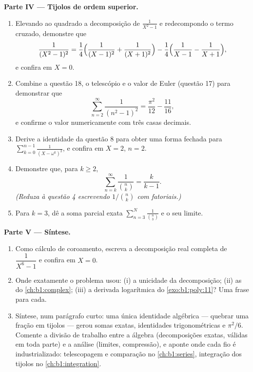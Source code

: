 \begin{problem}
\medskip
\noindent\textbf{Parte IV --- Tijolos de ordem superior.}
\begin{enumerate}
  \item Elevando ao quadrado a decomposição de $\frac1{X^2-1}$ e
        redecompondo o termo cruzado, demonstre que
        \[
        \frac1{(X^2-1)^2}
        = \frac14\Bigl(\frac1{(X-1)^2} + \frac1{(X+1)^2}\Bigr)
        - \frac14\Bigl(\frac1{X-1} - \frac1{X+1}\Bigr),
        \]
        e confira em $X = 0$.
  \item Combine a questão 18, o telescópio e o valor de Euler
        (questão 17) para demonstrar que
        \[
        \sum_{n=2}^{\infty}\frac1{(n^2-1)^2}
        = \frac{\pi^2}{12} - \frac{11}{16} ,
        \]
        e confirme o valor numericamente com três casas decimais.
  \item Derive a identidade da questão 8 para obter uma
        forma fechada para $\sum_{k=0}^{n-1}\frac1{(X -
        \omega^k)^2}$, e confira em $X = 2$, $n = 2$.
  \item Demonstre que, para $k \geq 2$,
        \[
        \sum_{n=k}^{\infty}\frac{1}{\binom nk} = \frac{k}{k-1} .
        \]
        \emph{(Reduza à questão 4 escrevendo $1/\binom nk$ com
        fatoriais.)}
  \item Para $k = 3$, dê a soma parcial exata
        $\sum_{n=3}^{N}\frac1{\binom n3}$ e o seu limite.
\end{enumerate}

\medskip
\noindent\textbf{Parte V --- Síntese.}
\begin{enumerate}
  \item Como cálculo de coroamento, escreva a decomposição real
        completa de $\dfrac1{X^6 - 1}$ e confira em $X =
        0$.
  \item Onde exatamente o problema usou: (i) a unicidade da
        decomposição; (ii) as  do
        \cref{ch:b1:complex}; (iii) a derivada logarítmica
        do \cref{exo:b1:poly:11}? Uma frase para cada.
  \item Síntese, num parágrafo curto: uma única identidade algébrica
        --- quebrar uma fração em tijolos --- gerou somas
        exatas, identidades trigonométricas e $\pi^2/6$. Comente
        a divisão de trabalho entre a álgebra (decomposições exatas,
        válidas em toda parte) e a análise (limites,
        compressão), e aponte onde cada fio é
        industrializado: telescopagem e comparação no
        \cref{ch:b1:series}, integração dos tijolos no
        \cref{ch:b1:integration}.
\end{enumerate}
\end{problem}

